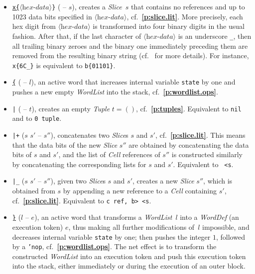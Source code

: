 \documentclass[12pt,oneside]{article}
\def\refpoint#1{{\rm\textbf{\ref{#1}}}}
\let\ptref=\refpoint
\begin{document}
\begin{itemize}
\item {\tt \underline{x\{}$\langle\textit{hex-data}\rangle$\}} ( -- $s$), creates a {\em Slice}~$s$ that contains no references and up to 1023 data bits specified in $\langle\textit{hex-data}\rangle$, cf.~\ptref{p:slice.lit}. More precisely, each hex digit from $\langle\textit{hex-data}\rangle$ is transformed into four binary digits in the usual fashion. After that, if the last character of $\langle\textit{hex-data}\rangle$ is an underscore {\tt \_}, then all trailing binary zeroes and the binary one immediately preceding them are removed from the resulting binary string (cf.~\cite[1.0]{TVM} for more details). For instance, {\tt x\{6C\_\}} is equivalent to {\tt b\{01101\}}.
\item {\tt \underline{\{}} ( -- $l$), an active word that increases internal variable {\tt state} by one and pushes a new empty {\em WordList\/} into the stack, cf.~\ptref{p:wordlist.ops}.
\item {\tt |} ( -- $t$), creates an empty {\em Tuple\/} $t=()$, cf.~\ptref{p:tuples}. Equivalent to {\tt nil} and to {\tt 0 tuple}.
\item {\tt |+} ($s$ $s'$ -- $s''$), concatenates two {\em Slice}\/s $s$ and $s'$, cf.~\ptref{p:slice.lit}. This means that the data bits of the new {\em Slice\/} $s''$ are obtained by concatenating the data bits of $s$ and $s'$, and the list of {\em Cell\/} references of $s''$ is constructed similarly by concatenating the corresponding lists for $s$ and $s'$. Equivalent to {\tt <b rot s, swap s, b> <s}.
\item {\tt |\_} ($s$ $s'$ -- $s''$), given two {\em Slice\/}s $s$ and $s'$, creates a new {\em Slice\/} $s''$, which is obtained from $s$ by appending a new reference to a {\em Cell\/} containing $s'$, cf.~\ptref{p:slice.lit}. Equivalent to {\tt <b rot s, swap s>c ref, b> <s}.
\item {\tt \underline{\}}} ($l$ -- $e$), an active word that transforms a {\em WordList\/}~$l$ into a {\em WordDef\/} (an execution token) $e$, thus making all further modifications of~$l$ impossible, and decreases internal variable {\tt state} by one; then pushes the integer $1$, followed by a {\tt 'nop}, cf.~\ptref{p:wordlist.ops}. The net effect is to transform the constructed {\em WordList\/} into an execution token and push this execution token into the stack, either immediately or during the execution of an outer block.
\end{itemize}
\end{document}
